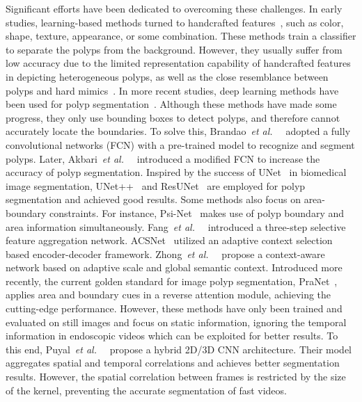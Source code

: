 \documentclass[runningheads]{llncs}
\def\etal{{\em et al.}}
\def\etal{{\em et al.~}}
\begin{document}
Significant efforts have been dedicated to overcoming these challenges. 
In early studies, learning-based methods turned to handcrafted features~\cite{mamonov2014automated,tajbakhsh2015automated}, such as color, shape, texture, appearance, or some combination. 
These methods train a classifier to separate the polyps from the background. 
However, they usually suffer from low accuracy due to the limited representation capability of handcrafted features in depicting heterogeneous polyps, as well as the close resemblance between polyps and hard mimics~\cite{yu2016integrating}.
In more recent studies, deep learning methods have been used for polyp segmentation~\cite{yu2016integrating,zhang2018polyp}. 
Although these methods have made some progress, they only use bounding boxes to detect polyps, and therefore cannot accurately locate the boundaries. 
To solve this, Brandao~\etal~\cite{brandao2017fully} adopted a fully convolutional networks (FCN) with a pre-trained model to recognize and segment polyps. 
Later, Akbari~\etal~\cite{akbari2018polyp} introduced a modified FCN to increase the accuracy of polyp segmentation.
Inspired by the success of UNet~\cite{ronneberger2015u} in biomedical image segmentation, UNet++~\cite{zhou2018unetplus} and ResUNet~\cite{jha2019resunetplus} are employed for polyp segmentation and achieved good results.
Some methods also focus on area-boundary constraints.
For instance, Psi-Net~\cite{murugesan2019psi} makes use of polyp boundary and area information simultaneously. 
Fang~\etal~\cite{fang2019selective} introduced a three-step selective feature aggregation network. 
ACSNet~\cite{zhang2020adaptive} utilized an adaptive context selection based encoder-decoder framework. 
Zhong~\etal~\cite{zhong2020polypseg} propose a context-aware network based on adaptive scale and global semantic context. 
Introduced more recently, the current golden standard for image polyp segmentation, PraNet~\cite{fan2020pra}, applies area and boundary cues in a reverse attention module, achieving the cutting-edge performance. 
However, these methods have only been trained and evaluated on still images and focus on static information, ignoring the temporal information in endoscopic videos which can be exploited for better results. 
To this end, Puyal~\etal~\cite{puyal2020endoscopic} propose a hybrid 2D/3D CNN architecture. 
Their model aggregates spatial and temporal correlations and achieves better segmentation results. 
However, the spatial correlation between frames is restricted by the size of the kernel, preventing the accurate segmentation of fast videos. 
\end{document}
